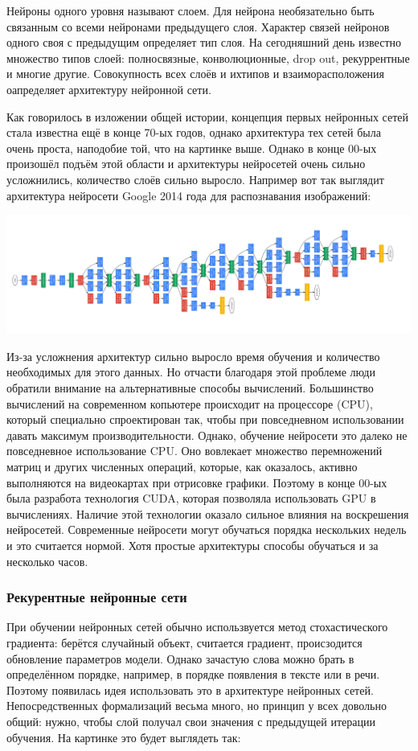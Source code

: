 \documentclass[a4paper,14pt]{extarticle}
\begin{document}
Нейроны одного уровня называют слоем. Для нейрона необязательно быть связанным со всеми нейронами предыдущего слоя. Характер связей нейронов одного своя с предыдущим определяет тип слоя. На сегодняшний день известно множество типов слоей: полносвязные, конволюционные, drop out, рекуррентные и многие другие. Совокупность всех слоёв и ихтипов и  взаиморасположения оапределяет архитектуру нейронной сети.

Как говорилось в изложении общей истории, концепция первых нейронных сетей стала известна ещё в конце 70-ых годов, однако архитектура тех сетей была очень проста, наподобие той, что на картинке выше. Однако в конце 00-ых произошёл подъём этой области и архитектуры нейросетей очень сильно усложнились, количество слоёв сильно выросло. Например вот так выглядит архитектура нейросети Google 2014 года для распознавания изображений:

\medskip

\includegraphics[width=1.0\linewidth]{net.png}

Из-за усложнения архитектур сильно выросло время обучения и количество необходимых для этого данных. Но отчасти благодаря этой проблеме люди обратили внимание на альтернативные способы вычислений. Большинство вычислений на современном копьютере происходит на процессоре (CPU), который специально спроектирован так, чтобы при повседневном использовании давать максимум производительности. Однако, обучение нейросети это далеко не повседневное использование CPU. Оно вовлекает множество перемножений матриц и других численных операций, которые, как оказалось, активно выполняются на видеокартах при отрисовке графики. Поэтому в конце 00-ых была разработа технология CUDA, которая позволяла использовать GPU в вычислениях. Наличие этой технологии оказало сильное влияния на воскрешения нейросетей. Современные нейросети могут обучаться порядка нескольких недель и это считается нормой. Хотя простые архитектуры способы обучаться и за несколько часов. 

\subsubsection{Рекурентные нейронные сети}
При обучении нейронных сетей обычно использвуется метод стохастического градиента: берётся случайный объект, считается градиент, происзодится обновление параметров модели. Однако зачастую слова можно брать в определённом порядке, например, в порядке появления в тексте или в речи. Поэтому появилась идея использовать это в архитектуре нейронных сетей. Непосредственных формализаций весьма много, но принцип у всех довольно общий: нужно, чтобы слой получал свои значения с предыдущей итерации обучения. На картинке это будет выглядеть так:
\end{document}

